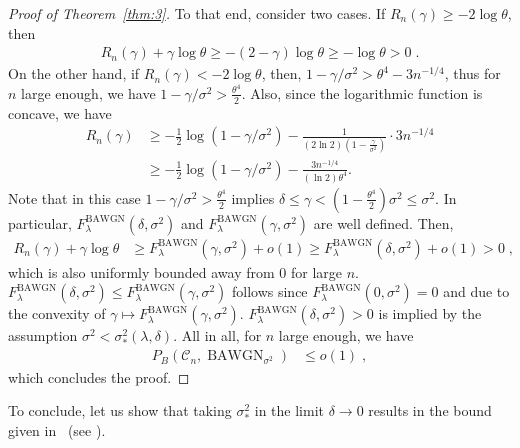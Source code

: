\documentclass{article}
\DeclareMathOperator{\BAWGN}{BAWGN}
\newcommand{\cC}{\mathcal{C}}
\theoremstyle{plain}
\theoremstyle{plain}
\theoremstyle{plain}
\theoremstyle{plain}
\theoremstyle{plain}
\theoremstyle{plain}
\theoremstyle{plain}
\theoremstyle{plain}
\theoremstyle{plain}
\theoremstyle{plain}
\theoremstyle{remark}
\theoremstyle{remark}
\theoremstyle{remark}
\theoremstyle{plain}
\begin{document}
\begin{proof}[Proof of Theorem~\ref{thm:3}]
To that end, consider two cases.
If $R_n(\gamma)\ge -2\log \theta$, then
\begin{align*}
    R_n(\gamma)+\gamma\log\theta \ge-(2-\gamma)\log\theta\ge-\log\theta>0\;.
\end{align*}
On the other hand, if $R_n(\gamma)< -2\log \theta$, then, $1-\gamma/\sigma^2>\theta^4-3n^{-1/4}$, thus for $n$ large enough, we have 
$1-\gamma/\sigma^2>\frac{\theta^4}{2}$. Also, since the logarithmic function is concave, we have 
\begin{align*}
    R_n(\gamma)&\ge -\frac{1}{2}\log\left(1-\gamma/\sigma^2\right)-\frac{1}{(2\ln2)(1-\frac{\gamma}{\sigma^2})}\cdot3n^{-1/4}\\&\ge -\frac{1}{2}\log\left(1-\gamma/\sigma^2\right)-\frac{3n^{-1/4}}{(\ln 2)\theta^4}.
\end{align*}
Note that in this case $1-\gamma/\sigma^2>\frac{\theta^4}{2}$
implies $\delta\le\gamma<\left(1-\frac{\theta^4}{2}\right)\sigma^2
\le\sigma^2$. In particular,
$F_\lambda^{\BAWGN}(\delta,\sigma^2)$ and
$F_\lambda^{\BAWGN}(\gamma,\sigma^2)$ are well defined.
Then,
\begin{align*}
     R_n(\gamma)+\gamma\log\theta&\ge F^{\BAWGN}_{\lambda}(\gamma,\sigma^2)+o(1)
     \ge F^{\BAWGN}_\lambda(\delta,\sigma^2)+o(1)>0\;, 
\end{align*}
which is also uniformly bounded
away from 0 for large $n$.
$F^{\BAWGN}_{\lambda}(\delta,\sigma^2)\le
F^{\BAWGN}_\lambda(\gamma,\sigma^2)$ follows
since 
$F_\lambda^{\BAWGN}(0,\sigma^2)=0$
and due to the convexity of $\gamma\mapsto F_\lambda^{\BAWGN}(\gamma,\sigma^2)$.
$F^{\BAWGN}_{\lambda}(\delta,\sigma^2)>0$ is implied by the
assumption $\sigma^2<\sigma_*^2(\lambda,\delta)$.
All in all, for $n$ large enough, we have
\begin{align*}
       P_B(\cC_n, \BAWGN_{\sigma^2})&\le o(1)\;,
   \end{align*}
which concludes the proof.
\end{proof}

To conclude, let us show that taking $\sigma_*^2$ in the limit $\delta\to 0$ 
results in the bound given in~\cite{hkazla2021codes} (see ).
\end{document}
